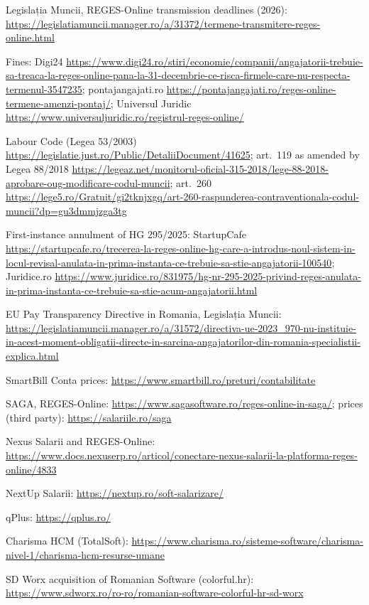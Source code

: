 \documentclass[10pt,a4paper]{article}
\begin{document}
{\begin{enumerate}[label={[\arabic*]},leftmargin=2.2em,itemsep=1.5pt]
\item Legislația Muncii, REGES-Online transmission deadlines (2026): \url{https://legislatiamuncii.manager.ro/a/31372/termene-transmitere-reges-online.html}
\item Fines: Digi24 \url{https://www.digi24.ro/stiri/economie/companii/angajatorii-trebuie-sa-treaca-la-reges-online-pana-la-31-decembrie-ce-risca-firmele-care-nu-respecta-termenul-3547235}; pontajangajati.ro \url{https://pontajangajati.ro/reges-online-termene-amenzi-pontaj/}; Universul Juridic \url{https://www.universuljuridic.ro/registrul-reges-online/}
\item Labour Code (Legea 53/2003) \url{https://legislatie.just.ro/Public/DetaliiDocument/41625}; art.~119 as amended by Legea 88/2018 \url{https://legeaz.net/monitorul-oficial-315-2018/lege-88-2018-aprobare-oug-modificare-codul-muncii}; art.~260 \url{https://lege5.ro/Gratuit/gi2tknjxgq/art-260-raspunderea-contraventionala-codul-muncii?dp=gu3dmmjzga3tg}
\item First-instance annulment of HG 295/2025: StartupCafe \url{https://startupcafe.ro/trecerea-la-reges-online-hg-care-a-introdus-noul-sistem-in-locul-revisal-anulata-in-prima-instanta-ce-trebuie-sa-stie-angajatorii-100540}; Juridice.ro \url{https://www.juridice.ro/831975/hg-nr-295-2025-privind-reges-anulata-in-prima-instanta-ce-trebuie-sa-stie-acum-angajatorii.html}
\item EU Pay Transparency Directive in Romania, Legislația Muncii: \url{https://legislatiamuncii.manager.ro/a/31572/directiva-ue-2023_970-nu-instituie-in-acest-moment-obligatii-directe-in-sarcina-angajatorilor-din-romania-specialistii-explica.html}
\item SmartBill Conta prices: \url{https://www.smartbill.ro/preturi/contabilitate}
\item SAGA, REGES-Online: \url{https://www.sagasoftware.ro/reges-online-in-saga/}; prices (third party): \url{https://salariile.ro/saga}
\item Nexus Salarii and REGES-Online: \url{https://www.docs.nexuserp.ro/articol/conectare-nexus-salarii-la-platforma-reges-online/4833}
\item NextUp Salarii: \url{https://nextup.ro/soft-salarizare/}
\item qPlus: \url{https://qplus.ro/}
\item Charisma HCM (TotalSoft): \url{https://www.charisma.ro/sisteme-software/charisma-nivel-1/charisma-hcm-resurse-umane}
\item SD Worx acquisition of Romanian Software (colorful.hr): \url{https://www.sdworx.ro/ro-ro/romanian-software-colorful-hr-sd-worx}

\end{enumerate}}
\end{document}
